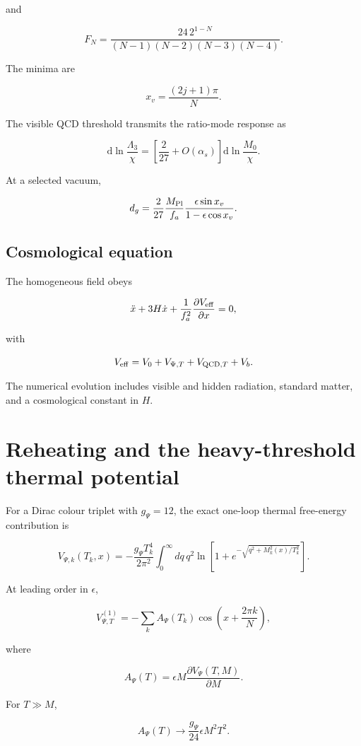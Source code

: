 \documentclass[
  10pt,
]{article}
\begin{document}
and

\[
F_N=
\frac{24\,2^{1-N}}
{(N-1)(N-2)(N-3)(N-4)}.
\]

The minima are

\[
x_v=\frac{(2j+1)\pi}{N}.
\]

The visible QCD threshold transmits the ratio-mode response as

\[
\mathrm d\ln\frac{\Lambda_3}{\chi}
=
\left[\frac{2}{27}+O(\alpha_s)\right]
\mathrm d\ln\frac{M_0}{\chi}.
\]

At a selected vacuum,

\[
d_g=
\frac{2}{27}\frac{M_{\rm Pl}}{f_a}
\frac{\epsilon\sin x_v}{1-\epsilon\cos x_v}.
\]

\subsection{Cosmological equation}\label{cosmological-equation}

The homogeneous field obeys

\[
\ddot x+3H\dot x+\frac{1}{f_a^2}\frac{\partial V_{\rm eff}}{\partial x}=0,
\]

with

\[
V_{\rm eff}=V_0+V_{\Psi,T}+V_{{\rm QCD},T}+V_b.
\]

The numerical evolution includes visible and hidden radiation, standard
matter, and a cosmological constant in \(H\).

\section{Reheating and the heavy-threshold thermal
potential}\label{reheating-and-the-heavy-threshold-thermal-potential}

For a Dirac colour triplet with \(g_\Psi=12\), the exact one-loop
thermal free-energy contribution is

\[
V_{\Psi,k}(T_k,x)
=-\frac{g_\Psi T_k^4}{2\pi^2}
\int_0^\infty dq\,q^2
\ln\left[1+e^{-\sqrt{q^2+M_k^2(x)/T_k^2}}\right].
\]

At leading order in \(\epsilon\),

\[
V_{\Psi,T}^{(1)}
=-\sum_k A_\Psi(T_k)
\cos\left(x+\frac{2\pi k}{N}\right),
\]

where

\[
A_\Psi(T)=
\epsilon M\frac{\partial V_\Psi(T,M)}{\partial M}.
\]

For \(T\gg M\),

\[
A_\Psi(T)\longrightarrow
\frac{g_\Psi}{24}\epsilon M^2T^2.
\]
\end{document}
